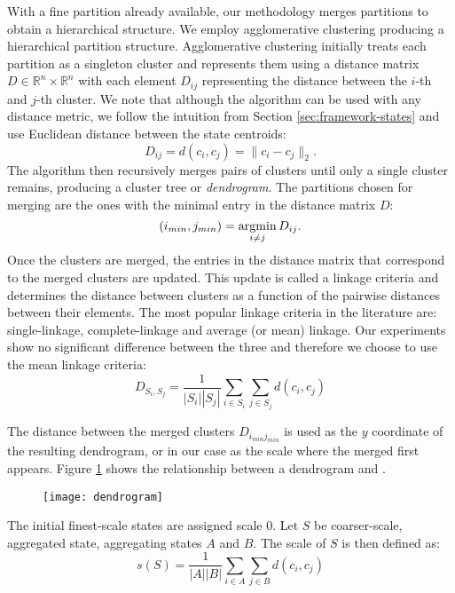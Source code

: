 With a fine partition already available, our methodology merges partitions to obtain a hierarchical structure. We employ agglomerative clustering \cite{Murtagh83} producing a hierarchical partition structure. Agglomerative clustering initially treats each partition as a singleton cluster and represents them using a distance matrix $D \in \mathbb{R}^n \times \mathbb{R}^n$ with each element $D_{ij}$ representing the distance between the $i$-th and $j$-th cluster. We note that although the algorithm can be used with any distance metric, we follow the intuition from Section \ref{sec:framework-states} and use Euclidean distance between the state centroids:
\begin{equation}
	\nonumber
	D_{ij} = d(c_i, c_j) = \|c_i - c_j\|_2.
\end{equation}
The algorithm then recursively merges pairs of clusters until only a single cluster remains, producing a cluster tree or \textit{dendrogram}. The partitions chosen for merging are the ones with the minimal entry in the distance matrix $D$:
\begin{equation}
	\nonumber
	(i_{min},j_{min}) = \argmin\limits_{i \neq j}D_{ij}.
\end{equation}
Once the clusters are merged, the entries in the distance matrix that correspond to the merged clusters are updated. This update is called a linkage criteria \lstopar{[cite???]} and determines the distance between clusters as a function of the pairwise distances between their elements. The most popular linkage criteria in the literature are: single-linkage, complete-linkage and average (or mean) linkage. Our experiments show no significant difference between the three and therefore we choose to use the mean linkage criteria:
\begin{equation}
	\nonumber
	D_{S_i,S_j} = \frac{1}{\left|S_i\right|\left|S_j\right|}\sum\limits_{i \in S_i}\sum\limits_{j \in S_j} d(c_i,c_j)
\end{equation}

The distance between the merged clusters $D_{i_{min} j_{min}}$ is used as the $y$ coordinate of the resulting dendrogram, or in our case as the scale where the merged  first appears. Figure \ref{fig:dendrogram} shows the relationship between a dendrogram and .
\begin{figure}[h!]
	\centering
	\texttt{[image: dendrogram]}
	\caption{}
	\label{fig:dendrogram}
\end{figure}
The initial finest-scale states are assigned scale $0$. Let $S$ be coarser-scale, aggregated state, aggregating states $A$ and $B$. The scale of $S$ is then defined as:
\begin{equation}
	\nonumber
	s(S) = \frac{1}{\left|A\right|\left|B\right|}\sum\limits_{i \in A}\sum\limits_{j \in B} d(c_i,c_j)
\end{equation} 

